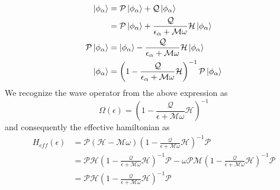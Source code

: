 \begin{align}
 \ket{\phi_\alpha} &= \mathcal{P}\ket{\phi_\alpha} + \mathcal{Q}\ket{\phi_\alpha} \nonumber \\
 &= \mathcal{P}\ket{\phi_\alpha} + \frac{\mathcal{Q}}{\epsilon_\alpha + \mathcal{M}\omega}\mathcal{H}\ket{\phi_\alpha} \nonumber \\
 \mathcal{P}\ket{\phi_\alpha} &= \ket{\phi_\alpha} - \frac{\mathcal{Q}}{\epsilon_\alpha + \mathcal{M}\omega}\mathcal{H}\ket{\phi_\alpha}  \nonumber \\
 \ket{\phi_\alpha} &= \left(1 - \frac{\mathcal{Q}}{\epsilon_\alpha + \mathcal{M}\omega}\mathcal{H}\right)^{-1}\mathcal{P}\ket{\phi_\alpha}
\end{align}
We recognize the wave operator from the above expression as
\begin{equation}
 \Omega(\epsilon) = \left(1 - \frac{\mathcal{Q}}{\epsilon + \mathcal{M}\omega}\mathcal{H}\right)^{-1}
\end{equation} and consequently the effective hamiltonian as
\begin{align}
 H_{eff}(\epsilon) &= \mathcal{P}(\mathcal{H} - \mathcal{M}\omega)\left(1 - \frac{\mathcal{Q}}{\epsilon + \mathcal{M}\omega}\mathcal{H}\right)^{-1}\mathcal{P} \nonumber\\
 &= \mathcal{P}\mathcal{H}\left(1 - \frac{\mathcal{Q}}{\epsilon + \mathcal{M}\omega}\mathcal{H}\right)^{-1}\mathcal{P} - \omega\mathcal{P}\mathcal{M}\left(1 - \frac{\mathcal{Q}}{\epsilon + \mathcal{M}\omega}\mathcal{H}\right)^{-1}\mathcal{P} \nonumber\\
 &= \mathcal{P}\mathcal{H}\left(1 - \frac{\mathcal{Q}}{\epsilon + \mathcal{M}\omega}\mathcal{H}\right)^{-1}\mathcal{P}
\end{align} 

